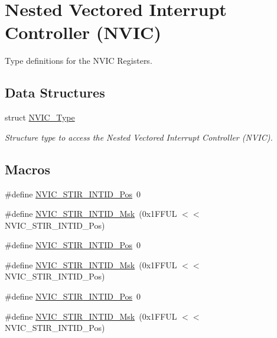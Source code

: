 \hypertarget{group___c_m_s_i_s___n_v_i_c}{}\section{Nested Vectored Interrupt Controller (N\+V\+IC)}
\label{group___c_m_s_i_s___n_v_i_c}


Type definitions for the N\+V\+IC Registers.  


\subsection*{Data Structures}
\begin{DoxyCompactItemize}
\item 
struct \mbox{\hyperlink{struct_n_v_i_c___type}{N\+V\+I\+C\+\_\+\+Type}}
\begin{DoxyCompactList}\small\item\em Structure type to access the Nested Vectored Interrupt Controller (N\+V\+IC). \end{DoxyCompactList}\end{DoxyCompactItemize}
\subsection*{Macros}
\begin{DoxyCompactItemize}
\item 
\#define \mbox{\hyperlink{group___c_m_s_i_s___n_v_i_c_ga9eebe495e2e48d302211108837a2b3e8}{N\+V\+I\+C\+\_\+\+S\+T\+I\+R\+\_\+\+I\+N\+T\+I\+D\+\_\+\+Pos}}~0
\item 
\#define \mbox{\hyperlink{group___c_m_s_i_s___n_v_i_c_gae4060c4dfcebb08871ca4244176ce752}{N\+V\+I\+C\+\_\+\+S\+T\+I\+R\+\_\+\+I\+N\+T\+I\+D\+\_\+\+Msk}}~(0x1\+F\+F\+U\+L $<$$<$ N\+V\+I\+C\+\_\+\+S\+T\+I\+R\+\_\+\+I\+N\+T\+I\+D\+\_\+\+Pos)
\item 
\#define \mbox{\hyperlink{group___c_m_s_i_s___n_v_i_c_ga9eebe495e2e48d302211108837a2b3e8}{N\+V\+I\+C\+\_\+\+S\+T\+I\+R\+\_\+\+I\+N\+T\+I\+D\+\_\+\+Pos}}~0
\item 
\#define \mbox{\hyperlink{group___c_m_s_i_s___n_v_i_c_gae4060c4dfcebb08871ca4244176ce752}{N\+V\+I\+C\+\_\+\+S\+T\+I\+R\+\_\+\+I\+N\+T\+I\+D\+\_\+\+Msk}}~(0x1\+F\+F\+U\+L $<$$<$ N\+V\+I\+C\+\_\+\+S\+T\+I\+R\+\_\+\+I\+N\+T\+I\+D\+\_\+\+Pos)
\item 
\#define \mbox{\hyperlink{group___c_m_s_i_s___n_v_i_c_ga9eebe495e2e48d302211108837a2b3e8}{N\+V\+I\+C\+\_\+\+S\+T\+I\+R\+\_\+\+I\+N\+T\+I\+D\+\_\+\+Pos}}~0
\item 
\#define \mbox{\hyperlink{group___c_m_s_i_s___n_v_i_c_gae4060c4dfcebb08871ca4244176ce752}{N\+V\+I\+C\+\_\+\+S\+T\+I\+R\+\_\+\+I\+N\+T\+I\+D\+\_\+\+Msk}}~(0x1\+F\+F\+U\+L $<$$<$ N\+V\+I\+C\+\_\+\+S\+T\+I\+R\+\_\+\+I\+N\+T\+I\+D\+\_\+\+Pos)
\end{DoxyCompactItemize}


